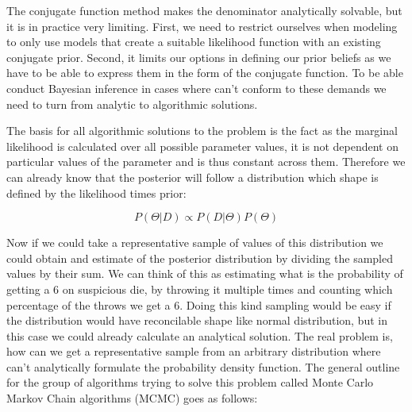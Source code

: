 \documentclass[12pt,a4paper,leqno]{report}
\theoremstyle{plain}
\theoremstyle{definition}
\theoremstyle{remark}
\begin{document}
The conjugate function method makes the denominator analytically solvable, but it
is in practice very limiting. First, we need to restrict ourselves when
modeling to only use models that create a suitable likelihood function with an existing
conjugate prior. Second, it limits our options in defining our prior
beliefs as we have to be able to express them in the form of the conjugate function. To
be able conduct Bayesian inference in cases where can't conform to these demands we need
to turn from analytic to algorithmic solutions.

The basis for all algorithmic solutions to the problem is the fact
as the marginal likelihood is calculated over all possible parameter values, it is
not dependent on particular values of the parameter and is thus constant across
them. Therefore we can already know that the posterior will follow a distribution which
shape is defined by the likelihood times prior:

\begin{def}\label{bayespropto}
    \begin{equation}
        P(\Theta|D) \propto P(D|\Theta)P(\Theta)
    \end{equation}
\end{def}

Now if we could take a representative sample of values of this distribution we could
obtain and estimate of the posterior distribution by dividing the sampled values by
their sum. We can think of this as estimating what is the probability of getting a 6 on
suspicious die, by throwing it multiple times and counting which percentage of the
throws we get a 6. Doing this kind sampling would be easy if the distribution would have reconcilable shape like
normal distribution, but in this case we could already calculate an analytical
solution. The real problem is, how can we get a representative sample from an arbitrary
distribution where can't analytically formulate the probability density function.
The general outline for the group of algorithms trying to solve this problem called
Monte Carlo Markov Chain algorithms (MCMC) goes as follows:
\end{document}
